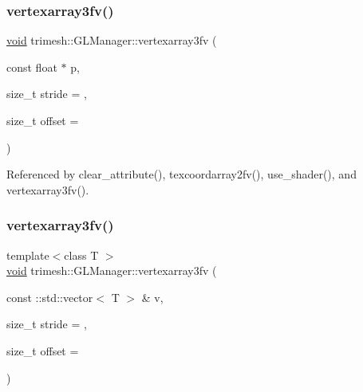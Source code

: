 \subsubsection{\texorpdfstring{vertexarray3fv()}{vertexarray3fv()}\hspace{0.1cm}{\footnotesize\ttfamily [1/3]}}
{\footnotesize\ttfamily \hyperlink{namespacetrimesh_a784ddfd979e1c579bda795a8edfc3f43}{void} trimesh\+::\+G\+L\+Manager\+::vertexarray3fv (\begin{DoxyParamCaption}\item[{const float $\ast$}]{p,  }\item[{size\+\_\+t}]{stride = {},  }\item[{size\+\_\+t}]{offset = {} }\end{DoxyParamCaption})}



Referenced by clear\+\_\+attribute(), texcoordarray2fv(), use\+\_\+shader(), and vertexarray3fv().

\mbox{\label{classtrimesh_1_1GLManager_ae7a26205c88e388ad0a89275017082af}} 
\subsubsection{\texorpdfstring{vertexarray3fv()}{vertexarray3fv()}\hspace{0.1cm}{\footnotesize\ttfamily [2/3]}}
{\footnotesize\ttfamily template$<$class T $>$ \\
\hyperlink{namespacetrimesh_a784ddfd979e1c579bda795a8edfc3f43}{void} trimesh\+::\+G\+L\+Manager\+::vertexarray3fv (\begin{DoxyParamCaption}\item[{const \+::std\+::vector$<$ T $>$ \&}]{v,  }\item[{size\+\_\+t}]{stride = {},  }\item[{size\+\_\+t}]{offset = {} }\end{DoxyParamCaption})\hspace{0.3cm}{\ttfamily [inline]}}

\mbox{\label{classtrimesh_1_1GLManager_a00eeb9971cd41dfa02cb72ea732267f7}} 
